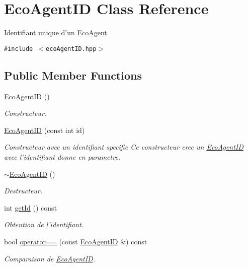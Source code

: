 \hypertarget{classEcoAgentID}{
\section{EcoAgentID Class Reference}
\label{classEcoAgentID}
}
Identifiant unique d'un \hyperlink{classEcoAgent}{EcoAgent}.  


{\tt \#include $<$ecoAgentID.hpp$>$}

\subsection*{Public Member Functions}
\begin{CompactItemize}
\item 
\hyperlink{classEcoAgentID_9c337e2ad56912db99193c03d1f82c56}{EcoAgentID} ()
\begin{CompactList}\small\item\em Constructeur. \item\end{CompactList}\item 
\hyperlink{classEcoAgentID_ac86e5972be4318755f16a28c3f0d2dc}{EcoAgentID} (const int id)
\begin{CompactList}\small\item\em Constructeur avec un identifiant specifie Ce constructeur cree un \hyperlink{classEcoAgentID}{EcoAgentID} avec l'identifiant donne en parametre. \item\end{CompactList}\item 
\hyperlink{classEcoAgentID_97da1c0ae8891bbf10feb0574ef64a26}{$\sim$EcoAgentID} ()
\begin{CompactList}\small\item\em Destructeur. \item\end{CompactList}\item 
int \hyperlink{classEcoAgentID_30abc8a92bd07523b8e4f4baf312b56e}{getId} () const 
\begin{CompactList}\small\item\em Obtention de l'identifiant. \item\end{CompactList}\item 
bool \hyperlink{classEcoAgentID_a6c183361e0ccdab9da2c6666d77c111}{operator==} (const \hyperlink{classEcoAgentID}{EcoAgentID} \&) const 
\begin{CompactList}\small\item\em Comparaison de \hyperlink{classEcoAgentID}{EcoAgentID}. \item\end{CompactList}\item 

\end{CompactItemize}
